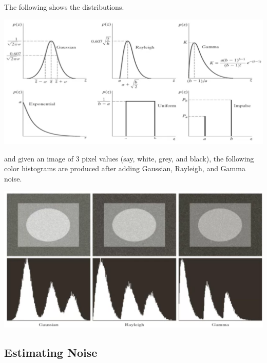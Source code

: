 \documentclass{article}
\begin{document}
    The following shows the distributions. 
    \begin{center}
        \includegraphics[scale=0.3]{img/noise_distributions.png}
    \end{center}
    and given an image of 3 pixel values (say, white, grey, and black), the following color histograms are produced after adding Gaussian, Rayleigh, and Gamma noise. 
    \begin{center}
        \includegraphics[scale=0.3]{img/noise_histograms.png}
    \end{center}

  \subsection{Estimating Noise}
\end{document}

